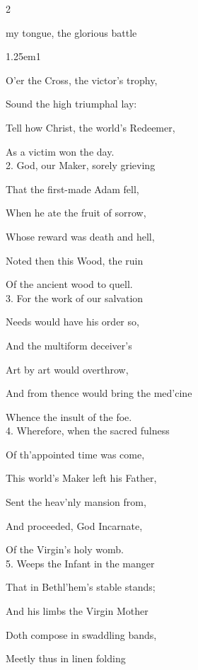 \begin{paracol}{2}
\mattins
{}

\mattinsInvitatoryHymn
{} my tongue, the glorious battle


\begin{hangparas}{1.25em}{1}

O'er the Cross, the victor's trophy,

Sound the high triumphal lay:

Tell how Christ, the world's Redeemer,

As a victim won the day.\\

2. God, our Maker, sorely grieving

That the first-made Adam fell,

When he ate the fruit of sorrow,

Whose reward was death and hell,

Noted then this Wood, the ruin

Of the ancient wood to quell.\\

3. For the work of our salvation

Needs would have his order so,

And the multiform deceiver's

Art by art would overthrow,

And from thence would bring the med'cine

Whence the insult of the foe.\\

4. Wherefore, when the sacred fulness

Of th'appointed time was come,

This world's Maker left his Father,

Sent the heav'nly mansion from,

And proceeded, God Incarnate,

Of the Virgin's holy womb.\\

5. Weeps the Infant in the manger

That in Bethl'hem's stable stands;

And his limbs the Virgin Mother

Doth compose in swaddling bands,

Meetly thus in linen folding


\end{hangparas}
\end{paracol}
